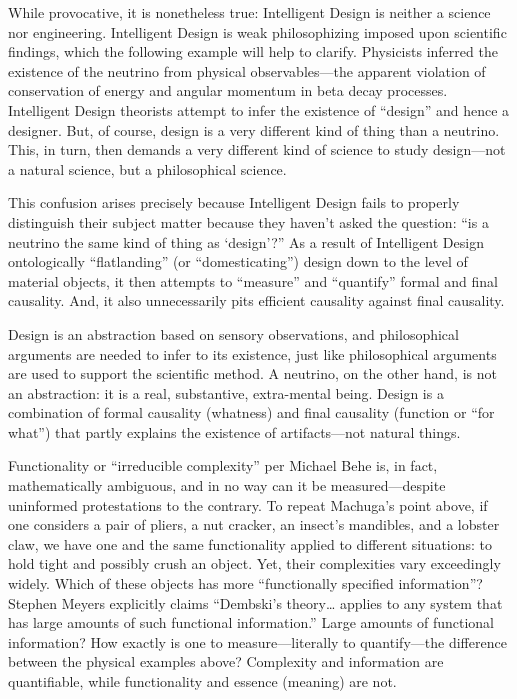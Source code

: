 While provocative, it is nonetheless true: Intelligent Design is neither a science nor engineering. Intelligent Design is weak philosophizing imposed upon scientific findings, which the following example will help to clarify. Physicists inferred the existence of the neutrino from physical observables—the apparent violation of conservation of energy and angular momentum in beta decay processes. Intelligent Design theorists attempt to infer the existence of “design” and hence a designer. But, of course, design is a very different kind of thing than a neutrino. This, in turn, then demands a very different kind of science to study design—not a natural science, but a philosophical science.

This confusion arises precisely because Intelligent Design fails to properly distinguish their subject matter because they haven’t asked the question: “is a neutrino the same kind of thing as ‘design’?” As a result of Intelligent Design ontologically “flatlanding” (or “domesticating”) design down to the level of material objects, it then attempts to “measure” and “quantify” formal and final causality. And, it also unnecessarily pits efficient causality against final causality.

Design is an abstraction based on sensory observations, and philosophical arguments are needed to infer to its existence, just like philosophical arguments are used to support the scientific method. A neutrino, on the other hand, is not an abstraction: it is a real, substantive, extra-mental being. Design is a combination of formal causality (whatness) and final causality (function or “for what”) that partly explains the existence of artifacts—not natural things.

Functionality or “irreducible complexity” per Michael Behe is, in fact, mathematically ambiguous, and in no way can it be measured—despite uninformed protestations to the contrary. To repeat Machuga’s point above, if one considers a pair of pliers, a nut cracker, an insect’s mandibles, and a lobster claw, we have one and the same functionality applied to different situations: to hold tight and possibly crush an object. Yet, their complexities vary exceedingly widely. Which of these objects has more “functionally specified information”? Stephen Meyers explicitly claims “Dembski’s theory… applies to any system that has large amounts of such functional information.”\cite[pg.~372]{sigcell} Large amounts of functional information? How exactly is one to measure—literally to quantify—the difference between the physical examples above? Complexity and information are quantifiable, while functionality and essence (meaning) are not.

